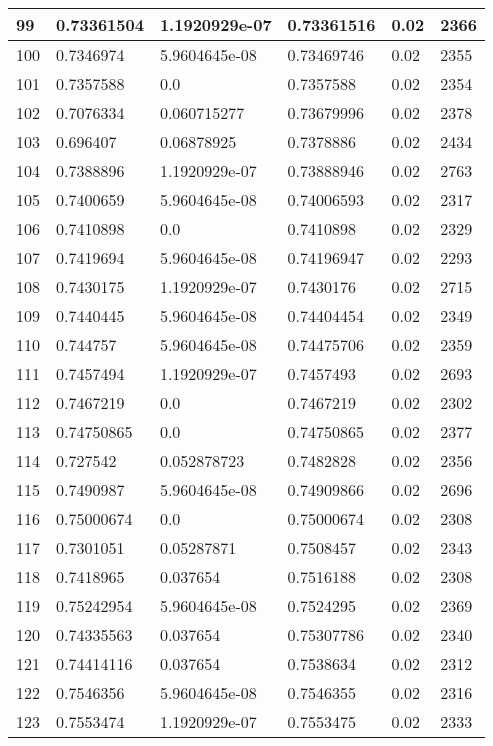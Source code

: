 \begin{longtable}{|l|l|l|l|l|l|}
99 & 0.73361504 & 1.1920929e-07 & 0.73361516 & 0.02 & 2366 \\ \hline 
100 & 0.7346974 & 5.9604645e-08 & 0.73469746 & 0.02 & 2355 \\ \hline 
101 & 0.7357588 & 0.0 & 0.7357588 & 0.02 & 2354 \\ \hline 
102 & 0.7076334 & 0.060715277 & 0.73679996 & 0.02 & 2378 \\ \hline 
103 & 0.696407 & 0.06878925 & 0.7378886 & 0.02 & 2434 \\ \hline 
104 & 0.7388896 & 1.1920929e-07 & 0.73888946 & 0.02 & 2763 \\ \hline 
105 & 0.7400659 & 5.9604645e-08 & 0.74006593 & 0.02 & 2317 \\ \hline 
106 & 0.7410898 & 0.0 & 0.7410898 & 0.02 & 2329 \\ \hline 
107 & 0.7419694 & 5.9604645e-08 & 0.74196947 & 0.02 & 2293 \\ \hline 
108 & 0.7430175 & 1.1920929e-07 & 0.7430176 & 0.02 & 2715 \\ \hline 
109 & 0.7440445 & 5.9604645e-08 & 0.74404454 & 0.02 & 2349 \\ \hline 
110 & 0.744757 & 5.9604645e-08 & 0.74475706 & 0.02 & 2359 \\ \hline 
111 & 0.7457494 & 1.1920929e-07 & 0.7457493 & 0.02 & 2693 \\ \hline 
112 & 0.7467219 & 0.0 & 0.7467219 & 0.02 & 2302 \\ \hline 
113 & 0.74750865 & 0.0 & 0.74750865 & 0.02 & 2377 \\ \hline 
114 & 0.727542 & 0.052878723 & 0.7482828 & 0.02 & 2356 \\ \hline 
115 & 0.7490987 & 5.9604645e-08 & 0.74909866 & 0.02 & 2696 \\ \hline 
116 & 0.75000674 & 0.0 & 0.75000674 & 0.02 & 2308 \\ \hline 
117 & 0.7301051 & 0.05287871 & 0.7508457 & 0.02 & 2343 \\ \hline 
118 & 0.7418965 & 0.037654 & 0.7516188 & 0.02 & 2308 \\ \hline 
119 & 0.75242954 & 5.9604645e-08 & 0.7524295 & 0.02 & 2369 \\ \hline 
120 & 0.74335563 & 0.037654 & 0.75307786 & 0.02 & 2340 \\ \hline 
121 & 0.74414116 & 0.037654 & 0.7538634 & 0.02 & 2312 \\ \hline 
122 & 0.7546356 & 5.9604645e-08 & 0.7546355 & 0.02 & 2316 \\ \hline 
123 & 0.7553474 & 1.1920929e-07 & 0.7553475 & 0.02 & 2333 \\ \hline 

\end{longtable}
